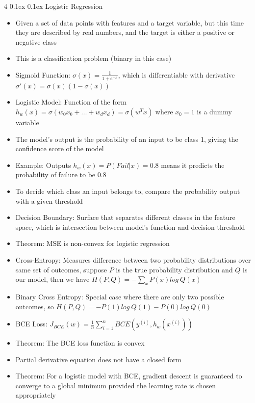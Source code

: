 \documentclass[10pt, landscape]{article}
\makeatletter
\renewcommand{\section}{\@startsection{section}{1}{0mm}%
  {0.1ex} %
  {0.1ex} %
  {\normalfont\large\bfseries}}
\makeatother
\begin{document}
\begin{multicols*}{4}
\section{Logistic Regression}
\begin{itemize}
    \item Given a set of data points with features and a target variable, but this time they are described by real numbers, and the target is either a positive or negative class
    \item This is a classification problem (binary in this case)
    \item Sigmoid Function: $\sigma(x)=\frac{1}{1+e^{-x}}$, which is differentiable with derivative $\sigma'(x)=\sigma(x)(1-\sigma(x))$
    \item Logistic Model: Function of the form $h_w(x)=\sigma(w_0x_0+...+w_dx_d)=\sigma(w^Tx)$ where $x_0=1$ is a dummy variable
    \item The model's output is the probability of an input to be class 1, giving the confidence score of the model
    \item Example: Outputs $h_w(x)=P(Fail | x)=0.8$ means it predicts the probability of failure to be $0.8$
    \item To decide which class an input belongs to, compare the probability output with a given threshold
    \item Decision Boundary: Surface that separates different classes in the feature space, which is intersection between model's function and decision threshold
    \item Theorem: MSE is non-convex for logistic regression
    \item Cross-Entropy: Measures difference between two probability distributions over same set of outcomes, suppose $P$ is the true probability distribution and $Q$ is our model, then we have $H(P,Q)=-\sum_xP(x)log\ Q(x)$
    \item Binary Cross Entropy: Special case where there are only two possible outcomes, so $H(P,Q)=-P(1)log\ Q(1) - P(0)log\ Q(0)$
    \item BCE Loss: $J_{BCE}(w)=\frac{1}{n}\sum_{i=1}^n BCE(y^{(i)}, h_w(x^{(i)}))$
    \item Theorem: The BCE loss function is convex
    \item Partial derivative equation does not have a closed form
    \item Theorem: For a logistic model with BCE, gradient descent is guaranteed to converge to a global minimum provided the learning rate is chosen appropriately

\end{itemize}
\end{multicols*}
\end{document}

